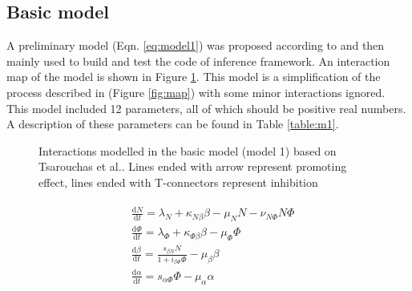 \subsection{Basic model}

A preliminary model (Eqn. \ref{eq:model1}) was proposed according to \cite{ref:Tsarouchas} and then mainly used to build and test the code of inference framework. An interaction map of the model is shown in Figure \ref{fig:m1}. This model is a simplification of the process described in \cite{ref:Tsarouchas} (Figure \ref{fig:map}) with some minor interactions ignored. This model included 12 parameters, all of which should be positive real numbers. A description of these parameters can be found in Table \ref{table:m1}.

\begin{figure}
    \begin{center}
    \end{center}

    \caption[Interactions modelled in the basic model]%
    {Interactions modelled in the basic model (model 1) based on Tsarouchas et al.\cite{ref:Tsarouchas}. Lines ended with arrow represent promoting effect, lines ended with T-connectors represent inhibition}
    \label{fig:m1}

\end{figure}

\begin{align}
    \label{eq:model1}
    \begin{split}
        &\frac{\mathrm{d} N}{\mathrm{d} t}=\lambda_N+\kappa_{N\beta}\beta-\mu_NN-\nu_{N\Phi}N\Phi\\
        &\frac{\mathrm{d} \Phi}{\mathrm{d} t}=\lambda_\Phi+\kappa_{\Phi\beta}\beta-\mu_\Phi\Phi\\
        &\frac{\mathrm{d} \beta}{\mathrm{d} t}=\frac{s_{\beta N}N}{1+i_{\beta\Phi}\Phi}-\mu_\beta\beta\\
        &\frac{\mathrm{d} \alpha}{\mathrm{d} t}=s_{\alpha\Phi}\Phi-\mu_\alpha\alpha
    \end{split}
\end{align}

